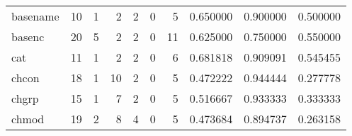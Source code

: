 \begin{tabular}{lrrrrrrrrr}
basename  &                                      10 &                                                  1 &                                                  2 &                                                  2 &                                                  0 &                                                  5 &                                           0.650000 &                               0.900000 &                             0.500000 \\
basenc    &                                      20 &                                                  5 &                                                  2 &                                                  2 &                                                  0 &                                                 11 &                                           0.625000 &                               0.750000 &                             0.550000 \\
cat       &                                      11 &                                                  1 &                                                  2 &                                                  2 &                                                  0 &                                                  6 &                                           0.681818 &                               0.909091 &                             0.545455 \\
chcon     &                                      18 &                                                  1 &                                                 10 &                                                  2 &                                                  0 &                                                  5 &                                           0.472222 &                               0.944444 &                             0.277778 \\
chgrp     &                                      15 &                                                  1 &                                                  7 &                                                  2 &                                                  0 &                                                  5 &                                           0.516667 &                               0.933333 &                             0.333333 \\
chmod     &                                      19 &                                                  2 &                                                  8 &                                                  4 &                                                  0 &                                                  5 &                                           0.473684 &                               0.894737 &                             0.263158 \\

\end{tabular}
